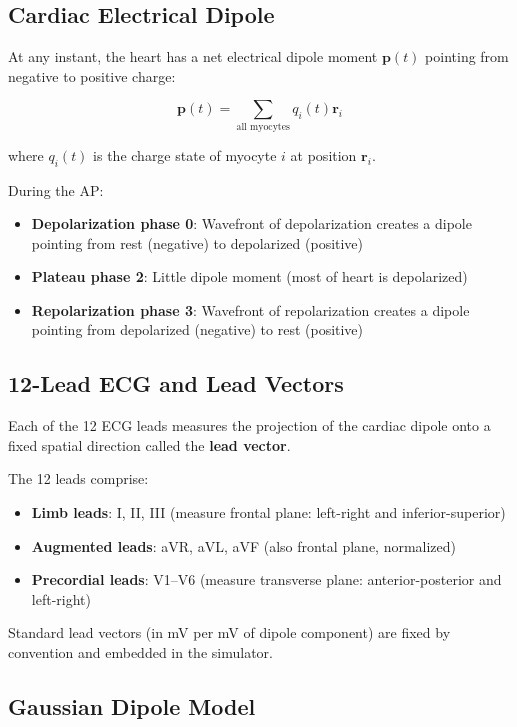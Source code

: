 \documentclass[12pt,a4paper,oneside]{book}
\begin{document}
\subsection{Cardiac Electrical Dipole}

At any instant, the heart has a net electrical dipole moment $\mathbf{p}(t)$ pointing from negative to positive charge:

$$\mathbf{p}(t) = \sum_{\text{all myocytes}} q_i(t) \mathbf{r}_i$$

\noindent where $q_i(t)$ is the charge state of myocyte $i$ at position $\mathbf{r}_i$.

During the AP:
\begin{itemize}
    \item \textbf{Depolarization phase 0}: Wavefront of depolarization creates a dipole pointing from rest (negative) to depolarized (positive)
    \item \textbf{Plateau phase 2}: Little dipole moment (most of heart is depolarized)
    \item \textbf{Repolarization phase 3}: Wavefront of repolarization creates a dipole pointing from depolarized (negative) to rest (positive)
\end{itemize}

\subsection{12-Lead ECG and Lead Vectors}

Each of the 12 ECG leads measures the projection of the cardiac dipole onto a fixed spatial direction called the \textbf{lead vector}.

The 12 leads comprise:

\begin{itemize}
    \item \textbf{Limb leads}: I, II, III (measure frontal plane: left-right and inferior-superior)
    \item \textbf{Augmented leads}: aVR, aVL, aVF (also frontal plane, normalized)
    \item \textbf{Precordial leads}: V1--V6 (measure transverse plane: anterior-posterior and left-right)
\end{itemize}

Standard lead vectors (in mV per mV of dipole component) are fixed by convention and embedded in the simulator.

\subsection{Gaussian Dipole Model}
\end{document}
